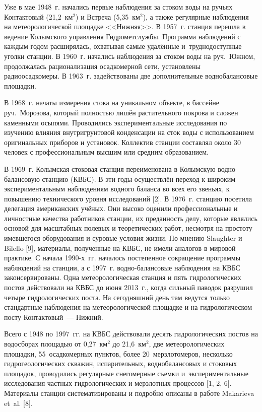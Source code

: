 Уже в мае 1948~г. начались первые наблюдения за стоком воды на ручьях Контактовый (21,2~км$^2$) и Встреча (5,35~км$^2$), а также регулярные наблюдения на метеорологической площадке <<Нижняя>>. В 1957~г. станция перешла в ведение Колымского управления Гидрометслужбы. Программа наблюдений с каждым годом расширялась, охватывая самые удалённые и~труднодоступные уголки станции. В 1960~г. начались наблюдения за стоком воды на руч.~Южном, продолжалась рационализация осадкомерной сети, установлены радиоосадкомеры. В 1963~г. задействованы две дополнительные воднобалансовые площадки.

В 1968~г. начаты измерения стока на уникальном объекте, в бассейне руч.~Морозова, который полностью лишён растительного покрова и сложен каменными осыпями. Проводились экспериментальные исследования по изучению влияния внутригрунтовой конденсации на сток воды с использованием оригинальных приборов и установок. Коллектив станции составлял около 30 человек с профессиональным высшим или средним образованием.

В 1969~г. Колымская стоковая станция переименована в Колымскую водно-балансовую станцию (КВБС). В эти годы осуществлён переход к широким экспериментальным наблюдениям водного баланса во всех его звеньях, к повышению технического уровня исследований [2]. В 1976~г. станцию посетила делегация американских учёных. Они высоко оценили профессиональные и личностные качества работников станции, их преданность делу, которые являлись основой для масштабных полевых и теоретических работ, несмотря на простоту имевшегося оборудования и суровые условия жизни. По мнению Slaughter и Bilello [9], материалы, полученные на КВБС, не имели аналогов в мировой практике.
\clearpage
С начала 1990-х~гг. началось постепенное сокращение программы наблюдений на станции, а с 1997~г. водно-балансовые наблюдения на КВБС законсервированы. Одна метеорологическая станция и пять гидрологических постов действовали на КВБС до июня 2013~г., когда сильный паводок разрушил четыре гидрологических поста. На сегодняшний день там ведутся только стандартные наблюдения на метеорологической площадке и на гидрологическом посту Контактовый~--- Нижний.

Всего с 1948 по 1997~гг. на КВБС действовали десять гидрологических постов на водосборах площадью от 0,27~км$^2$ до 21,6~км$^2$, две метеорологических площадки, 55~осадкомерных пунктов, более 20~мерзлотомеров, несколько гидрогеологических скважин, испарительных, воднобалансовых и стоковых площадок, проводились регулярные снегомерные съемки и~экспериментальные исследования частных гидрологических и мерзлотных процессов [1, 2, 6]. Материалы станции систематизированы и подробно описаны в работе Makarieva et~al. [8].

